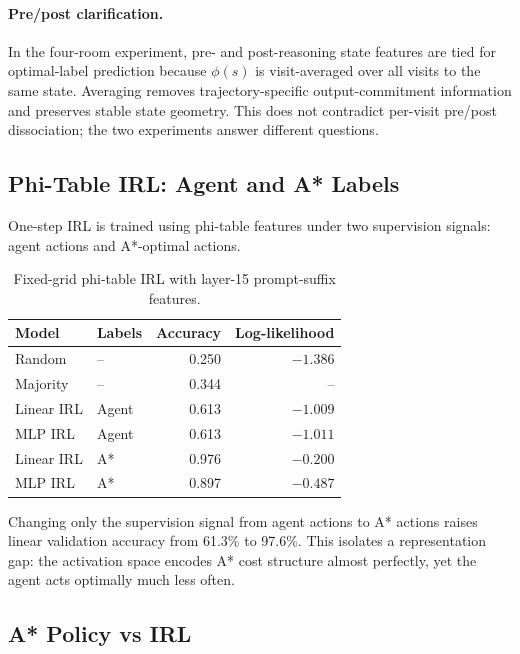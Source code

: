 \documentclass[11pt,a4paper]{article}
\begin{document}
\paragraph{Pre/post clarification.} In the four-room experiment, pre- and post-reasoning state features are tied for optimal-label prediction because $\phi(s)$ is visit-averaged over all visits to the same state. Averaging removes trajectory-specific output-commitment information and preserves stable state geometry. This does not contradict per-visit pre/post dissociation; the two experiments answer different questions.

\subsection{Phi-Table IRL: Agent and A* Labels}

One-step IRL is trained using phi-table features under two supervision signals: agent actions and A*-optimal actions.

\begin{table}[h]
\centering
\begin{tabular}{llrr}
\toprule
Model & Labels & Accuracy & Log-likelihood \\
\midrule
Random & -- & 0.250 & $-1.386$ \\
Majority & -- & 0.344 & -- \\
Linear IRL & Agent & 0.613 & $-1.009$ \\
MLP IRL & Agent & 0.613 & $-1.011$ \\
Linear IRL & A* & 0.976 & $-0.200$ \\
MLP IRL & A* & 0.897 & $-0.487$ \\
\bottomrule
\end{tabular}
\caption{Fixed-grid phi-table IRL with layer-15 prompt-suffix features.}
\label{tab:fixed-irl}
\end{table}

\begin{result}
Changing only the supervision signal from agent actions to A* actions raises linear validation accuracy from 61.3\% to 97.6\%. This isolates a representation gap: the activation space encodes A* cost structure almost perfectly, yet the agent acts optimally much less often.
\end{result}

\subsection{A* Policy vs IRL}
\end{document}
